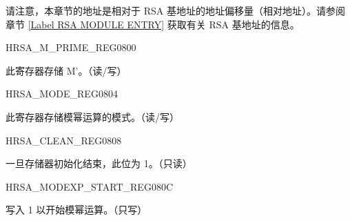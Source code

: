 请注意，本章节的地址是相对于 RSA 基地址的地址偏移量（相对地址）。请参阅章节 \ref{Label RSA MODULE ENTRY} 获取有关 RSA 基地址的信息。

\begin{register}{H}{RSA\_M\_PRIME\_REG}{\hexprefix{}0800}\label{regdesc:RSAMPRIMEREG}
%
\regnewline%
\begin{regdesc}\begin{reglist}
\item [RSA\_M\_PRIME\_REG] 此寄存器存储 M'。（读/写）
\end{reglist}\end{regdesc}
\end{register}

\begin{register}{H}{RSA\_MODE\_REG}{\hexprefix{}0804}\label{regdesc:RSAMODEREG}
%
%
\regnewline%
\begin{regdesc}\begin{reglist}
\item [RSA\_MODE] 此寄存器存储模幂运算的模式。（读/写）
\end{reglist}\end{regdesc}
\end{register}


\begin{register}{H}{RSA\_CLEAN\_REG}{\hexprefix{}0808}\label{regdesc:RSACLEANREG}
%
%
\regnewline%
\begin{regdesc}\begin{reglist}
\item [RSA\_CLEAN] 一旦存储器初始化结束，此位为 1。（只读）
\end{reglist}\end{regdesc}
\end{register}


\begin{register}{H}{RSA\_MODEXP\_START\_REG}{\hexprefix{}080C}\label{regdesc:RSAMODEXPSTARTREG}
%
%
\regnewline%
\begin{regdesc}\begin{reglist}
\item [RSA\_MODEXP\_START] 写入 1 以开始模幂运算。（只写）
\end{reglist}\end{regdesc}
\end{register}


